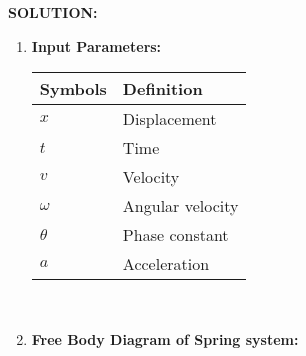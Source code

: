 \documentclass[journal,12pt,twocolumn]{IEEEtran}
\theoremstyle{remark}
\begin{document}
\textbf{SOLUTION:}\\
\begin{enumerate}
\item \textbf{Input Parameters:}
\begin{table}[h]
\begin{tabular}{|l|l|}
\hline
\textbf{Symbols} & \textbf{Definition}\\ \hline
$x$ & Displacement \\ \hline
$t$ & Time \\ \hline
$v$ & Velocity\\ \hline
$\omega$ & Angular velocity   \\ \hline
$\theta$ & Phase constant\\ \hline
$a$ & Acceleration\\ \hline
\end{tabular}
\end{table}\\
\item \textbf{Free Body Diagram of Spring system:}
\end{enumerate}
\end{document}

